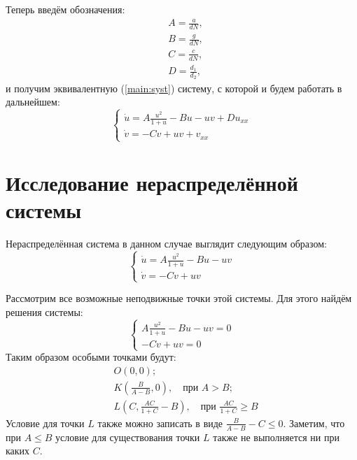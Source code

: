 \documentclass{article}
\begin{document}
Теперь введём обозначения:
\begin{equation*}
\begin{aligned}
&A = \frac{a}{dN},\\
&B = \frac{g}{dN},\\
&C = \frac{c}{dN},\\
&D = \frac{d_1}{d_2},
\end{aligned}
\end{equation*}
и получим эквивалентную (\ref{main:syst}) систему, с которой и будем работать в дальнейшем:
\begin{equation}
\begin{cases}\label{trans:syst}	
\dot u =A\frac{u^2}{1 + u} - Bu - uv + D u_{x x}\\
\dot v = - Cv + uv + v_{xx}
\end{cases}
\end{equation}

\section{Исследование нераспределённой системы}

Нераспределённая система в данном случае выглядит следующим образом:
\begin{equation}
\begin{cases}\label{undist:syst}	
\dot u =A\frac{u^2}{1 + u} - Bu - uv\\
\dot v = - Cv + uv
\end{cases}
\end{equation}

Рассмотрим все возможные неподвижные точки этой системы. Для этого найдём решения системы:
\begin{equation*}
\begin{cases}
A\frac{u^2}{1 + u} - Bu - uv = 0\\
 - Cv + uv = 0
\end{cases}
\end{equation*}
Таким образом особыми точками будут:
\begin{equation*}
\begin{aligned}
&O(0, 0);\\
&K \left(\frac{B}{A-B}, 0\right), \quad \text{при } A > B;\\
&L\left(C, \frac{AC}{1 + C} - B\right), \quad \text{при } \frac{AC}{1 + C} \geq B
\end{aligned}
\end{equation*}
Условие для точки $L$ также можно записать в виде $\frac{B}{A - B} - C \leq 0$. Заметим, что при $A \leq B$ условие для существования точки $L$ также не выполняется ни при каких $C$.
\end{document}
